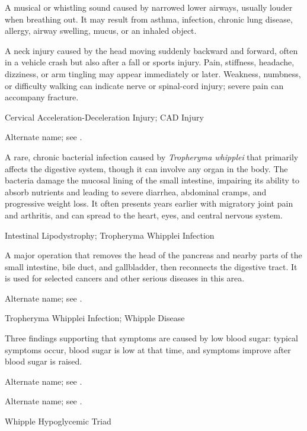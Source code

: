  A musical or whistling sound caused by narrowed lower airways, usually louder when breathing out. It may result from asthma, infection, chronic lung disease, allergy, airway swelling, mucus, or an inhaled object.

 A neck injury caused by the head moving suddenly backward and forward, often in a vehicle crash but also after a fall or sports injury. Pain, stiffness, headache, dizziness, or arm tingling may appear immediately or later. Weakness, numbness, or difficulty walking can indicate nerve or spinal-cord injury; severe pain can accompany fracture.

\synonyms
Cervical Acceleration-Deceleration Injury; CAD Injury

 Alternate name; see .

 A rare, chronic bacterial infection caused by \textit{Tropheryma whipplei} that primarily affects the digestive system, though it can involve any organ in the body. The bacteria damage the mucosal lining of the small intestine, impairing its ability to absorb nutrients and leading to severe diarrhea, abdominal cramps, and progressive weight loss. It often presents years earlier with migratory joint pain and arthritis, and can spread to the heart, eyes, and central nervous system.

\synonyms
Intestinal Lipodystrophy; Tropheryma Whipplei Infection

 A major operation that removes the head of the pancreas and nearby parts of the small intestine, bile duct, and gallbladder, then reconnects the digestive tract. It is used for selected cancers and other serious diseases in this area.

 Alternate name; see .

\synonyms
Tropheryma Whipplei Infection; Whipple Disease

 Three findings supporting that symptoms are caused by low blood sugar: typical symptoms occur, blood sugar is low at that time, and symptoms improve after blood sugar is raised.

 Alternate name; see .

 Alternate name; see .

\synonyms
Whipple Hypoglycemic Triad

